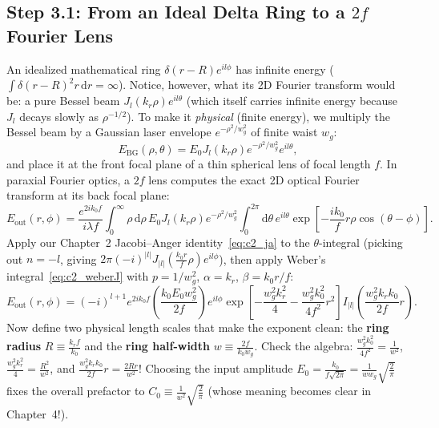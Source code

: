 \documentclass[10pt,letterpaper]{article}
\newcommand{\abs}[1]{\lvert #1 \rvert}
\newcommand{\dd}{\mathrm{d}}
\numberwithin{equation}{section}
\begin{document}
\subsection{Step 3.1: From an Ideal Delta Ring to a $2f$ Fourier Lens}

An idealized mathematical ring $\delta(r-R)e^{il\phi}$ has infinite energy ($\int \delta(r-R)^2 r\,\dd r = \infty$). Notice, however, what its 2D Fourier transform would be: a pure Bessel beam $J_l(k_r\rho)e^{il\theta}$ (which itself carries infinite energy because $J_l$ decays slowly as $\rho^{-1/2}$). To make it \emph{physical} (finite energy), we multiply the Bessel beam by a Gaussian laser envelope $e^{-\rho^2/w_g^2}$ of finite waist $w_g$:
\begin{equation}
  E_{\mathrm{BG}}(\rho,\theta) = E_0 J_l(k_r\rho) e^{-\rho^2/w_g^2} e^{il\theta},
\end{equation}
and place it at the front focal plane of a thin spherical lens of focal length $f$. In paraxial Fourier optics, a $2f$ lens computes the exact 2D optical Fourier transform at its back focal plane:
\begin{equation}
  E_{\mathrm{out}}(r,\phi) = \frac{e^{2ik_0 f}}{i\lambda f}\int_0^\infty \rho\,\dd\rho\,E_0 J_l(k_r\rho)e^{-\rho^2/w_g^2}\int_0^{2\pi}\dd\theta\,e^{il\theta}\exp\!\left[-\frac{ik_0}{f}r\rho\cos(\theta-\phi)\right].
\end{equation}
Apply our Chapter~2 Jacobi--Anger identity~\eqref{eq:c2_ja} to the $\theta$-integral (picking out $n = -l$, giving $2\pi(-i)^{\abs{l}}J_{\abs{l}}(\frac{k_0 r}{f}\rho)e^{il\phi}$), then apply Weber's integral~\eqref{eq:c2_weberJ} with $p = 1/w_g^2$, $\alpha = k_r$, $\beta = k_0 r/f$:
\begin{equation}
  E_{\mathrm{out}}(r,\phi) = (-i)^{l+1} e^{2ik_0 f}\left(\frac{k_0 E_0 w_g^2}{2f}\right) e^{il\phi}\exp\!\left[-\frac{w_g^2 k_r^2}{4} - \frac{w_g^2 k_0^2}{4f^2}r^2\right] I_{\abs{l}}\!\left(\frac{w_g^2 k_r k_0}{2f}r\right).
\end{equation}
Now define two physical length scales that make the exponent clean: the \textbf{ring radius} $R \equiv \frac{k_r f}{k_0}$ and the \textbf{ring half-width} $w \equiv \frac{2f}{k_0 w_g}$. Check the algebra: $\frac{w_g^2 k_0^2}{4f^2} = \frac{1}{w^2}$, $\frac{w_g^2 k_r^2}{4} = \frac{R^2}{w^2}$, and $\frac{w_g^2 k_r k_0}{2f}r = \frac{2Rr}{w^2}$! Choosing the input amplitude $E_0 = \frac{k_0}{f\sqrt{2\pi}} = \frac{1}{w w_g}\sqrt{\frac{2}{\pi}}$ fixes the overall prefactor to $C_0 \equiv \frac{1}{w^2}\sqrt{\frac{2}{\pi}}$ (whose meaning becomes clear in Chapter~4!).
\end{document}
